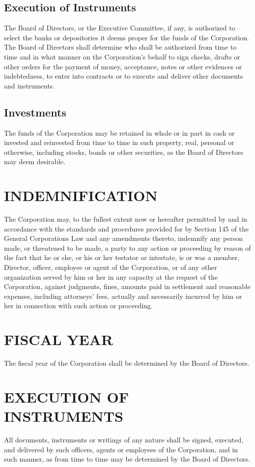 \documentclass{article}
\begin{document}
\subsection{Execution of Instruments}
The Board of Directors, or the Executive Committee, if any, is authorized to select the banks or depositories it deems proper for the funds of the Corporation.  The Board of Directors shall determine who shall be authorized from time to time and in what manner on the Corporation’s behalf to sign checks, drafts or other orders for the payment of money, acceptance, notes or other evidences or indebtedness, to enter into contracts or to execute and deliver other documents and instruments.
\subsection{Investments}
The funds of the Corporation may be retained in whole or in part in cash or invested and reinvested from time to time in such property, real, personal or otherwise, including stocks, bonds or other securities, as the Board of Directors may deem desirable.
\section{INDEMNIFICATION}
The Corporation may, to the fullest extent now or hereafter permitted by and in accordance with the standards and procedures provided for by Section 145 of the General Corporations Law and any amendments thereto, indemnify any person made, or threatened to be made, a party to any action or proceeding by reason of the fact that he or she, or his or her testator or intestate, is or was a member, Director, officer, employee or agent of the Corporation, or of any other organization served by him or her in any capacity at the request of the Corporation, against judgments, fines, amounts paid in settlement and reasonable expenses, including attorneys’ fees, actually and necessarily incurred by him or her in connection with such action or proceeding.
\section{FISCAL YEAR}
The fiscal year of the Corporation shall be determined by the Board of Directors.
\section{EXECUTION OF INSTRUMENTS}
All documents, instruments or writings of any nature shall be signed, executed, and delivered by such officers, agents or employees of the Corporation, and in such manner, as from time to time may be determined by the Board of Directors.
\end{document}
